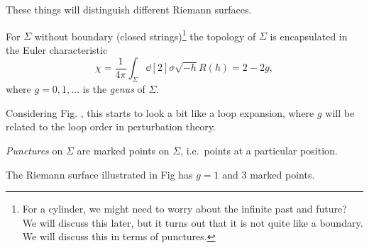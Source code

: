 These things will distinguish different Riemann surfaces.
\begin{definition}[genus]
  For $\Sigma$  without boundary (closed strings)\footnote{For a cylinder, we might need to worry about the infinite past and future? We will discuss this later, but it turns out that it is not quite like a boundary. We will discuss this in terms of punctures.} the topology of $\Sigma$  is encapsulated in the Euler characteristic
  \begin{equation}
    \chi = \frac{1}{4\pi} \int_\Sigma \dd[2]{\sigma} \sqrt{-h} R(h) = 2 - 2g,
  \end{equation}
  where $g = 0, 1, \dots$ is the \emph{genus} of $\Sigma$.
\end{definition}
Considering Fig.%
, this starts to look a bit like a loop expansion, where $g$  will be related to the loop order in perturbation theory.
\begin{definition}[punctures]
  \emph{Punctures} on $\Sigma$ are marked points on $\Sigma$, i.e.~points at a particular position.
\end{definition}
\begin{example}[]
  The Riemann surface illustrated in Fig %
  has $g = 1$ and $3$ marked points.
\end{example}
